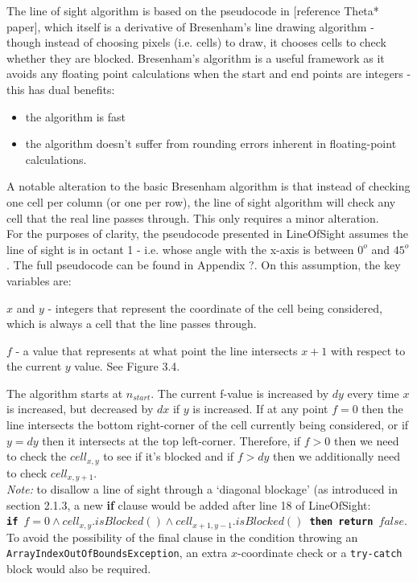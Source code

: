 \documentclass[12pt,twoside,notitlepage]{report}
\begin{document}
\noindent
The line of sight algorithm is based on the pseudocode in [reference Theta* paper], which itself is a derivative of Bresenham's line drawing algorithm - though instead of choosing pixels (i.e. cells) to draw, it chooses cells to check whether they are blocked. Bresenham's algorithm is a useful framework as it avoids any floating point calculations when the start and end points are integers - this has dual benefits:
\begin{itemize}
\item the algorithm is fast
\item the algorithm doesn't suffer from rounding errors inherent in floating-point calculations. 
\end{itemize}
\noindent
A notable alteration to the basic Bresenham algorithm is that instead of checking one cell per column (or one per row), the line of sight algorithm will check any cell that the real line passes through. This only requires a minor alteration.\\

\noindent
For the purposes of clarity, the pseudocode presented in {\sc LineOfSight} assumes the line of sight is in octant 1 - i.e. whose angle with the x-axis is between $0^{o}$ and $45^{o}$. The full pseudocode can be found in Appendix ?. On this assumption, the key variables are:
\begin{description}
\item{$x$ and $y$} - integers that represent the coordinate of the cell being considered, which is always a cell that the line passes through.
\item{$f$} - a value that represents at what point the line intersects $x+1$ with respect to the current $y$ value. See Figure 3.4.
\end{description}

\noindent
The algorithm starts at $n_{start}$. The current f-value is increased by $dy$ every time $x$ is increased, but decreased by $dx$ if $y$ is increased. If at any point $f = 0$ then the line intersects the bottom right-corner of the cell currently being considered, or if $y = dy$ then it intersects at the top left-corner. Therefore, if $f > 0$ then we need to check the $cell_{x,y}$ to see if it's blocked and if $f > dy$ then we additionally need to check $cell_{x,y+1}$.\\

\noindent
{\em Note:} to disallow a line of sight through a `diagonal blockage' (as introduced in section 2.1.3, a new {\bf if} clause would be added after line 18 of {\sc LineOfSight}:\\
\noindent 
{\tt {\bf if} $f = 0 \land cell_{x,y}.isBlocked() \land cell_{x+1,y-1}.isBlocked()$ {\bf then return} $false$}.\\
\noindent 
To avoid the possibility of the final clause in the condition throwing an {\tt ArrayIndexOutOfBoundsException}, an extra $x$-coordinate check or a {\tt try-catch} block would also be required.
\end{document}
